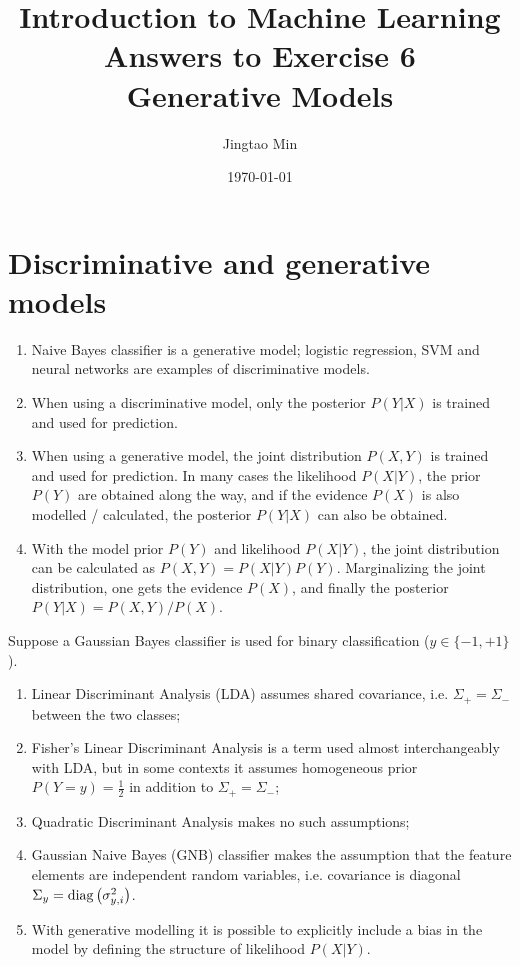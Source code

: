 \documentclass[a4paper, 10pt]{article}
\title{{\bfseries Introduction to Machine Learning} \\ Answers to Exercise 6 \\ Generative Models}
\author{Jingtao Min}
\date{\today}
\begin{document}
\maketitle

\section{Discriminative and generative models}

\begin{enumerate}[label=(\alph*)]
    \item Naive Bayes classifier is a generative model; logistic regression, SVM and neural networks are examples of discriminative models.
    \item When using a discriminative model, only the posterior $P(Y|X)$ is trained and used for prediction.
    \item When using a generative model, the joint distribution $P(X, Y)$ is trained and used for prediction. In many cases the likelihood $P(X|Y)$, the prior $P(Y)$ are obtained along the way, and if the evidence $P(X)$ is also modelled / calculated, the posterior $P(Y|X)$ can also be obtained.
    \item With the model prior $P(Y)$ and likelihood $P(X|Y)$, the joint distribution can be calculated as $P(X, Y) = P(X|Y) P(Y)$. Marginalizing the joint distribution, one gets the evidence $P(X)$, and finally the posterior $P(Y|X) = P(X, Y) / P(X)$.
\end{enumerate}

Suppose a Gaussian Bayes classifier is used for binary classification ($y \in \{-1, +1\}$).
\begin{enumerate}[label=(\alph*), resume]
    \item Linear Discriminant Analysis (LDA) assumes shared covariance, i.e. $\Sigma_+ = \Sigma_-$ between the two classes;
    \item Fisher's Linear Discriminant Analysis is a term used almost interchangeably with LDA, but in some contexts it assumes homogeneous prior $P(Y=y)=\frac{1}{2}$ in addition to $\Sigma_+ = \Sigma_-$;
    \item Quadratic Discriminant Analysis makes no such assumptions;
    \item Gaussian Naive Bayes (GNB) classifier makes the assumption that the feature elements are independent random variables, i.e. covariance is diagonal $\Sigma_y = {\rm diag}\left(\sigma_{y, i}^2\right)$.
    \item With generative modelling it is possible to explicitly include a bias in the model by defining the structure of likelihood $P(X|Y)$.
\end{enumerate}
\end{document}
